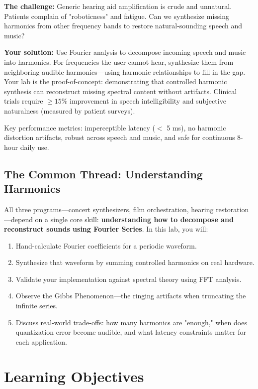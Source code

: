 \documentclass[11pt,letterpaper]{article}
\begin{document}
\textbf{The challenge:} Generic hearing aid amplification is crude and unnatural. Patients complain of "roboticness" and fatigue. Can we synthesize missing harmonics from other frequency bands to restore natural-sounding speech and music?

\textbf{Your solution:} Use Fourier analysis to decompose incoming speech and music into harmonics. For frequencies the user cannot hear, synthesize them from neighboring audible harmonics—using harmonic relationships to fill in the gap. Your lab is the proof-of-concept: demonstrating that controlled harmonic synthesis can reconstruct missing spectral content without artifacts. Clinical trials require $\geq 15\%$ improvement in speech intelligibility and subjective naturalness (measured by patient surveys).

Key performance metrics: imperceptible latency ($<$ 5 ms), no harmonic distortion artifacts, robust across speech and music, and safe for continuous 8-hour daily use.

\subsection{The Common Thread: Understanding Harmonics}

All three programs—concert synthesizers, film orchestration, hearing restoration—depend on a single core skill: \textbf{understanding how to decompose and reconstruct sounds using Fourier Series}. In this lab, you will:

\begin{enumerate}
    \item Hand-calculate Fourier coefficients for a periodic waveform.
    \item Synthesize that waveform by summing controlled harmonics on real hardware.
    \item Validate your implementation against spectral theory using FFT analysis.
    \item Observe the Gibbs Phenomenon—the ringing artifacts when truncating the infinite series.
    \item Discuss real-world trade-offs: how many harmonics are "enough," when does quantization error become audible, and what latency constraints matter for each application.
\end{enumerate}

\clearpage

\section{Learning Objectives}
\end{document}
